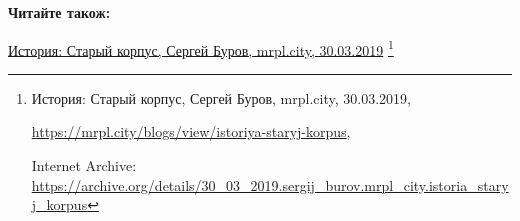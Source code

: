  
 
 
 
 

\def\pubIA{https://archive.org/details/30_03_2019.sergij_burov.mrpl_city.istoria_staryj_korpus}
\def\pubOrigin{https://mrpl.city/blogs/view/istoriya-staryj-korpus}

\textbf{Читайте також:} \par\href{\pubIA}{%
История: Старый корпус, Сергей Буров, mrpl.city, 30.03.2019}%
\footnote{История: Старый корпус, Сергей Буров, mrpl.city, 30.03.2019, \par\url{\pubOrigin}, \par Internet Archive: \url{\pubIA}}

